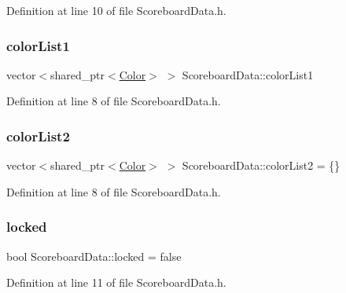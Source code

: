 Definition at line 10 of file Scoreboard\+Data.\+h.

\mbox{\label{struct_scoreboard_data_afe340df3f7d2b4f4701801ddd82f4941}} 
\subsubsection{\texorpdfstring{color\+List1}{colorList1}}
{\footnotesize\ttfamily vector$<$shared\+\_\+ptr$<$\hyperlink{struct_color}{Color}$>$ $>$ Scoreboard\+Data\+::color\+List1}



Definition at line 8 of file Scoreboard\+Data.\+h.

\mbox{\label{struct_scoreboard_data_a96734f5c133d8cc75459b60f71d705de}} 
\subsubsection{\texorpdfstring{color\+List2}{colorList2}}
{\footnotesize\ttfamily vector$<$shared\+\_\+ptr$<$\hyperlink{struct_color}{Color}$>$ $>$ Scoreboard\+Data\+::color\+List2 = \{\}}



Definition at line 8 of file Scoreboard\+Data.\+h.

\mbox{\label{struct_scoreboard_data_a1538b97991646d1fcfd36377a2e52f67}} 
\subsubsection{\texorpdfstring{locked}{locked}}
{\footnotesize\ttfamily bool Scoreboard\+Data\+::locked = false}



Definition at line 11 of file Scoreboard\+Data.\+h.

\mbox{\label{struct_scoreboard_data_a6c414dec169989de015aac17eab8adcb}} 
